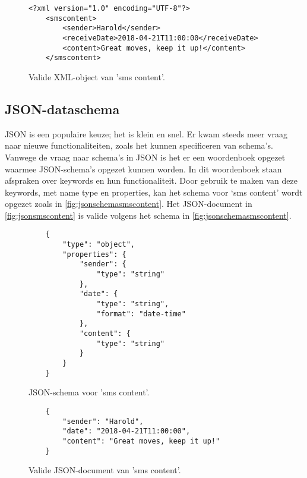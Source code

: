 \begin{figure}[htb]
    \centering
    \lstset{language=XML}
    \begin{lstlisting}[firstnumber=1]
    <?xml version="1.0" encoding="UTF-8"?>
    <smscontent>
        <sender>Harold</sender>
        <receiveDate>2018-04-21T11:00:00</receiveDate>
        <content>Great moves, keep it up!</content>
    </smscontent>              
    \end{lstlisting}
    \caption{Valide XML-object van 'sms content'.}
    \label{fig:xmlsmscontent}
\end{figure}

\pagebreak
\subsection{JSON-dataschema}
JSON is een populaire keuze; het is klein en snel. Er kwam steeds meer vraag naar nieuwe functionaliteiten, zoals het kunnen specificeren van schema’s\cite{Severance2012}. 
Vanwege de vraag naar schema’s in JSON is het er een woordenboek opgezet waarmee JSON-schema’s opgezet kunnen worden\cite{JsonSchemaOrg}. In dit woordenboek staan afspraken over keywords en hun functionaliteit. Door gebruik te maken van deze keywords, met name type en properties, kan het schema voor ‘sms content’ wordt opgezet zoals in \autoref{fig:jsonschemasmscontent}. Het JSON-document in \autoref{fig:jsonsmscontent} is valide volgens het schema in \autoref{fig:jsonschemasmscontent}.

\begin{figure}[htb]
    \centering
    \lstset{language=JSON}
    \begin{lstlisting}
    {
        "type": "object",
        "properties": {
            "sender": {
                "type": "string"
            },
            "date": {
                "type": "string",
                "format": "date-time"
            },
            "content": {
                "type": "string"
            }
        }
    }             
    \end{lstlisting}
    \caption{JSON-schema voor 'sms content'.}
    \label{fig:jsonschemasmscontent}
\end{figure}

\begin{figure}[htb]
    \centering
    \lstset{language=JSON}
    \begin{lstlisting}
    {
        "sender": "Harold",
        "date": "2018-04-21T11:00:00",
        "content": "Great moves, keep it up!"
    }                   
    \end{lstlisting}
    \caption{Valide JSON-document van 'sms content'.}
    \label{fig:jsonsmscontent}
\end{figure}

